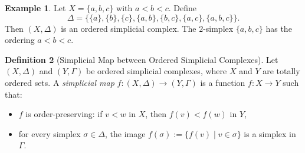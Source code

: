 \documentclass[11pt]{article}
\theoremstyle{definition}
\newtheorem{definition}{Definition}[section]
\newtheorem{example}[definition]{Example}
\theoremstyle{plain}
\begin{document}
\begin{example}
    Let $X = \{a, b, c\}$ with $a < b < c$. Define
    \[
        \Delta = \{ \{a\}, \{b\}, \{c\}, \{a,b\}, \{b,c\}, \{a,c\}, \{a,b,c\} \}.
    \]
    Then $(X, \Delta)$ is an ordered simplicial complex. The $2$-simplex $\{a,b,c\}$ has the ordering $a < b < c$.
\end{example}


\begin{definition}[Simplicial Map between Ordered Simplicial  Complexes]
    Let $(X, \Delta)$ and $(Y, \Gamma)$ be ordered simplicial complexes, where $X$ and $Y$ are totally ordered sets. A \emph{simplicial map} $f : (X, \Delta) \to (Y, \Gamma)$ is a function $f : X \to Y$ such that:
    \begin{itemize}
        \item $f$ is order-preserving: if $v < w$ in $X$, then $f(v) < f(w)$ in $Y$,
        \item for every simplex $\sigma \in \Delta$, the image $f(\sigma) := \{ f(v) \mid v \in \sigma \}$ is a simplex in $\Gamma$.
    \end{itemize}
\end{definition}
\end{document}
